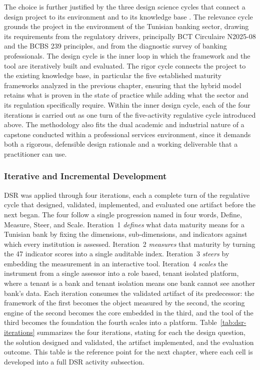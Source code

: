 The choice is further justified by the three design science cycles that connect a design project to its environment and to its knowledge base \cite{hevner2004}. The relevance cycle grounds the project in the environment of the Tunisian banking sector, drawing its requirements from the regulatory drivers, principally BCT Circulaire N\textdegree{}2025-08 and the BCBS 239 principles, and from the diagnostic survey of banking professionals. The design cycle is the inner loop in which the framework and the tool are iteratively built and evaluated. The rigor cycle connects the project to the existing knowledge base, in particular the five established maturity frameworks analyzed in the previous chapter, ensuring that the hybrid model retains what is proven in the state of practice while adding what the sector and its regulation specifically require. Within the inner design cycle, each of the four iterations is carried out as one turn of the five-activity regulative cycle introduced above. The methodology also fits the dual academic and industrial nature of a capstone conducted within a professional services environment, since it demands both a rigorous, defensible design rationale and a working deliverable that a practitioner can use.

\subsubsection{Iterative and Incremental Development}

DSR was applied through four iterations, each a complete turn of the regulative cycle that designed, validated, implemented, and evaluated one artifact before the next began. The four follow a single progression named in four words, Define, Measure, Steer, and Scale. Iteration~1 \emph{defines} what data maturity means for a Tunisian bank by fixing the dimensions, sub-dimensions, and indicators against which every institution is assessed. Iteration~2 \emph{measures} that maturity by turning the 47 indicator scores into a single auditable index. Iteration~3 \emph{steers} by embedding the measurement in an interactive tool. Iteration~4 \emph{scales} the instrument from a single assessor into a role based, tenant isolated platform, where a tenant is a bank and tenant isolation means one bank cannot see another bank's data. Each iteration consumes the validated artifact of its predecessor: the framework of the first becomes the object measured by the second, the scoring engine of the second becomes the core embedded in the third, and the tool of the third becomes the foundation the fourth scales into a platform. Table~\ref{tab:dsr-iterations} summarizes the four iterations, stating for each the design question, the solution designed and validated, the artifact implemented, and the evaluation outcome. This table is the reference point for the next chapter, where each cell is developed into a full DSR activity subsection.

